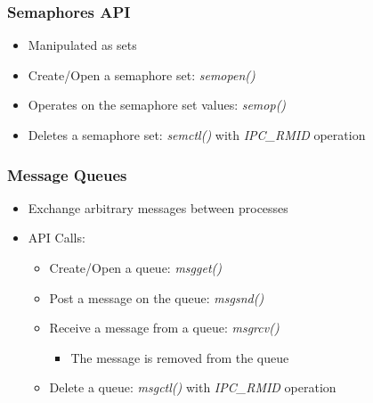 \begin{frame}
  \frametitle{Semaphores API}

  \begin{itemize}
  \item Manipulated as sets
  \item Create/Open a semaphore set: \emph{semopen()}
  \item Operates on the semaphore set values: \emph{semop()}
  \item Deletes a semaphore set: \emph{semctl()} with \emph{IPC\_RMID} operation
  \end{itemize}
\end{frame}


\begin{frame}
  \frametitle{Message Queues}

  \begin{itemize}
  \item Exchange arbitrary messages between processes
  \item API Calls:
    \begin{itemize}
    \item Create/Open a queue: \emph{msgget()}
    \item Post a message on the queue: \emph{msgsnd()}
    \item Receive a message from a queue: \emph{msgrcv()}
      \begin{itemize}
      \item The message is removed from the queue
      \end{itemize}
    \item Delete a queue: \emph{msgctl()} with \emph{IPC\_RMID} operation
    \end{itemize}
  \end{itemize}
\end{frame}


